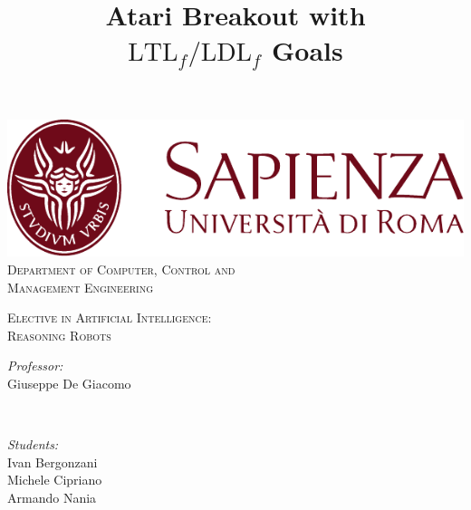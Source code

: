 \documentclass[a4paper]{article}
\begin{document}
\title{Atari Breakout with\\$\text{LTL}_f/\text{LDL}_f$ Goals}


\makeatletter
\let\thetitle\@title
\let\theauthor\@author
\let\thedate\@date
\makeatother

\begin{titlepage}
	\centering
    \vspace*{0.5 cm}
    \includegraphics[scale = 0.75]{images/SapienzaLogo}\\[1.0 cm]	%

    \vspace*{-0.3cm}
    \textsc{\large Department of Computer, Control and\\Management Engineering}\\[2.0 cm]	%
    \vspace*{1.2cm}

    { \fontsize{20.74pt}{18.5pt}\selectfont\bfseries \thetitle \par } %

    \vspace*{0.1cm}
    \textsc{\Large Elective in Artificial Intelligence:\\Reasoning Robots}\\[0.5 cm] %

    \vspace*{2.8cm}
	\begin{minipage}{0.4\textwidth}
		\begin{flushleft} \large
			\emph{Professor:}\\
			Giuseppe De Giacomo\\
		\end{flushleft}
	\end{minipage}~
	\begin{minipage}{0.4\textwidth}
		\begin{flushright} \large
			\emph{Students:} \\
            Ivan Bergonzani \\
			Michele Cipriano\\
            Armando Nania
		\end{flushright}


\end{minipage}
\end{titlepage}
\end{document}
